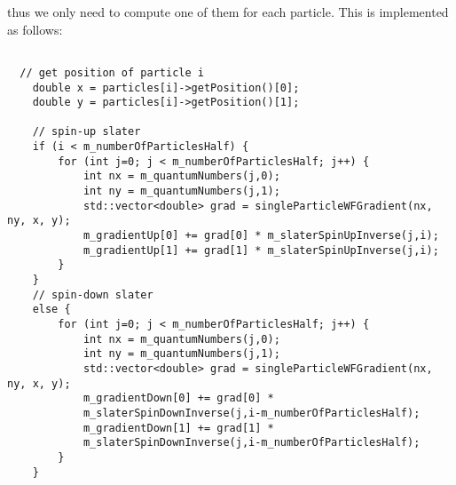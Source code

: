 \documentclass[english, a4paper]{article}
\begin{document}
thus we only need to compute one of them for each particle. This is implemented as follows:
\belowcaptionskip=-10pt
\begin{lstlisting}[label=slaterGradient,caption=Computation of the Slater gradient ratio for particle i. 
The spin-up matrix only contains the single-particle wave functions as functions of the first half of the 
particles. The spin-down matrix is a function of the second half. One of them is thus
zero for a given particle $i$.]

  // get position of particle i
    double x = particles[i]->getPosition()[0];
    double y = particles[i]->getPosition()[1];

    // spin-up slater
    if (i < m_numberOfParticlesHalf) {
        for (int j=0; j < m_numberOfParticlesHalf; j++) {
            int nx = m_quantumNumbers(j,0);
            int ny = m_quantumNumbers(j,1);
            std::vector<double> grad = singleParticleWFGradient(nx, ny, x, y);
            m_gradientUp[0] += grad[0] * m_slaterSpinUpInverse(j,i);
            m_gradientUp[1] += grad[1] * m_slaterSpinUpInverse(j,i);
        }
    }
    // spin-down slater
    else {
        for (int j=0; j < m_numberOfParticlesHalf; j++) {
            int nx = m_quantumNumbers(j,0);
            int ny = m_quantumNumbers(j,1);
            std::vector<double> grad = singleParticleWFGradient(nx, ny, x, y);
            m_gradientDown[0] += grad[0] * 
            m_slaterSpinDownInverse(j,i-m_numberOfParticlesHalf);
            m_gradientDown[1] += grad[1] * 
            m_slaterSpinDownInverse(j,i-m_numberOfParticlesHalf);
        }
    }
\end{lstlisting}
\end{document}

